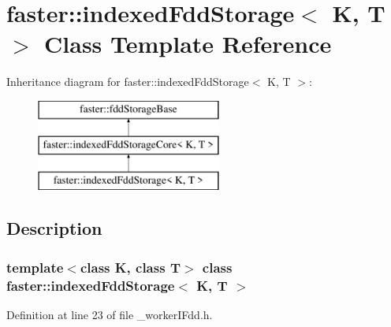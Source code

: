 \hypertarget{classfaster_1_1indexedFddStorage}{}\section{faster\+:\+:indexed\+Fdd\+Storage$<$ K, T $>$ Class Template Reference}
\label{classfaster_1_1indexedFddStorage}
Inheritance diagram for faster\+:\+:indexed\+Fdd\+Storage$<$ K, T $>$\+:\begin{figure}[H]
\begin{center}
\leavevmode
\includegraphics[height=3.000000cm]{classfaster_1_1indexedFddStorage}
\end{center}
\end{figure}


\subsection{Description}
\subsubsection*{template$<$class K, class T$>$\newline
class faster\+::indexed\+Fdd\+Storage$<$ K, T $>$}



Definition at line 23 of file \+\_\+worker\+I\+Fdd.\+h.

